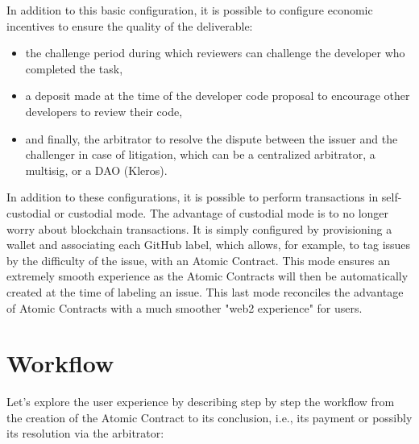 \documentclass[
	a4paper, %
	10pt, %
	unnumberedsections, %
	twoside, %
]{LTJournalArticle}
\begin{document}
In addition to this basic configuration, it is possible to configure economic incentives to ensure the quality of the deliverable:

\begin{itemize}
\item
  the challenge period during which reviewers can challenge the developer who completed the task,
\item
  a deposit made at the time of the developer code proposal to encourage other developers to review their code,
\item
  and finally, the arbitrator to resolve the dispute between the issuer and the challenger in case of litigation, which can be a centralized arbitrator, a multisig, or a DAO (Kleros).
\end{itemize}

In addition to these configurations, it is possible to perform transactions in self-custodial or custodial mode. The advantage of custodial mode is to no longer worry about blockchain transactions. It is simply configured by provisioning a wallet and associating each GitHub label, which allows, for example, to tag issues by the difficulty of the issue, with an Atomic Contract. This mode ensures an extremely smooth experience as the Atomic Contracts will then be automatically created at the time of labeling an issue. This last mode reconciles the advantage of Atomic Contracts with a much smoother "web2 experience" for users.



\section{Workflow}

Let's explore the user experience by describing step by step the workflow from the creation of the Atomic Contract to its conclusion, i.e., its payment or possibly its resolution via the arbitrator:
\end{document}
